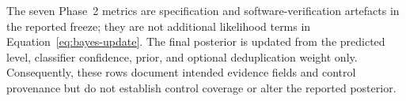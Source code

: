 \documentclass[final,3p,times,twocolumn]{elsarticle}
\begin{document}
	\begin{table}
		[h]
		\centering
		\caption{Metric specifications used at each level of the PrERT-CNM taxonomy.
		Missing evidence is recorded as \texttt{null} and the metric's contribution
		is set to its prior expectation, so that a policy is not penalised for silence
		unless silence is itself a control failure.}
		\label{tab:metrics}
		The seven Phase~2 metrics are specification and software-verification
		artefacts in the reported freeze; they are not additional likelihood
		terms in Equation~\ref{eq:bayes-update}. The final posterior is updated
		from the predicted level, classifier confidence, prior, and optional
		deduplication weight only. Consequently, these rows document intended
		evidence fields and control provenance but do not establish control
		coverage or alter the reported posterior.
        

\end{table}
\end{document}
